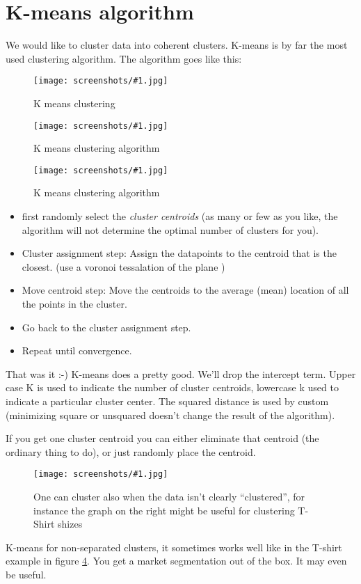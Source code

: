\documentclass[a4, 12pt, english, USenglish]{scrreprt}
\newcommand{\screenshot}[2]{
\begin{figure}[htb]
\texttt{[image: screenshots/\#1.jpg]}
\label{#1}
\caption{#2}
\end{figure}}
\newcommand{\idx}[1]{{\em #1}\index{#1}}
\begin{document}
\section{K-means algorithm}


We would like to cluster data into coherent clusters.  K-means is by
far the most used clustering algorithm.  The algorithm goes like this:

\screenshot{kmeansclustering1}{K means clustering}

\screenshot{kmeansclustering2}{K means clustering algorithm}
\screenshot{kmeansclustering3}{K means clustering algorithm}

\begin{itemize}
\item first randomly select the \idx{cluster centroids} (as many or few as you
  like, the algorithm will not determine the optimal number of
  clusters for you).  
\item Cluster assignment step:   Assign the datapoints to the centroid
  that is the closest.  (use a voronoi tessalation of the plane )
\item Move centroid step: Move the centroids to the average (mean)
  location of all the points in the cluster.

\item Go back to the cluster assignment step.

\item Repeat until convergence.

\end{itemize}

That was it :-)  K-means does a pretty good. We'll drop the intercept
term.  Upper case K is used to indicate the number of cluster
centroids, lowercase k used to indicate a particular cluster
center. The squared distance is used by custom (minimizing square or
unsquared doesn't change the result of the algorithm).

If you get one cluster centroid you can either eliminate that centroid
(the ordinary thing to do), or just randomly place the centroid.

\screenshot{nonseparatedkmeans}{One can cluster also when the data
  isn't clearly ``clustered'', for instance the graph on the right
  might be useful for clustering T-Shirt shizes}

K-means for non-separated clusters, it sometimes works well like in
the T-shirt example in figure \ref{nonseparatedkmeans}.  You get a
market segmentation out of the box. It may even be useful.
\end{document}
